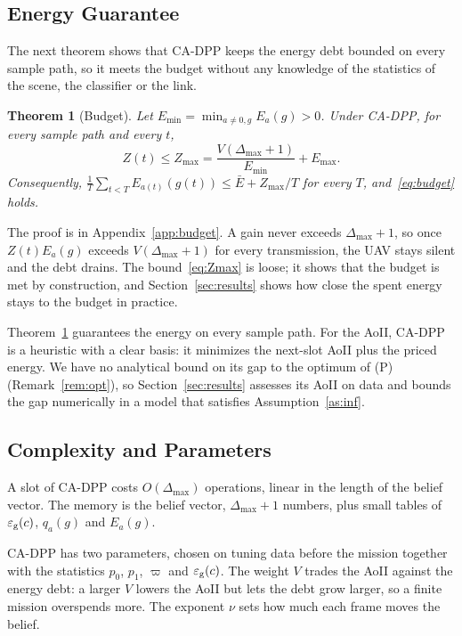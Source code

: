 \documentclass[5p,twocolumn]{elsarticle}
\newtheorem{theorem}{Theorem}
\theoremstyle{remark}
\newcommand{\ee}{\varepsilon}
\begin{document}
\subsection{Energy Guarantee}
The next theorem shows that CA-DPP keeps the energy debt bounded on every sample path, so it meets the budget without any knowledge of the statistics of the scene, the classifier or the link.

\begin{theorem}[Budget]\label{thm:budget}
Let $E_{\min}=\min_{a\neq0,g}E_a(g)>0$. Under CA-DPP, for every sample path and every $t$,
\begin{equation}\label{eq:Zmax}
Z(t)\le Z_{\max}=\frac{V(\Delta_{\max}+1)}{E_{\min}}+E_{\max}.
\end{equation}
Consequently, $\frac1T\sum_{t<T}E_{a(t)}(g(t))\le\bar E+Z_{\max}/T$ for every $T$, and~\eqref{eq:budget} holds.
\end{theorem}

The proof is in Appendix~\ref{app:budget}. A gain never exceeds $\Delta_{\max}+1$, so once $Z(t)E_a(g)$ exceeds $V(\Delta_{\max}+1)$ for every transmission, the UAV stays silent and the debt drains. The bound~\eqref{eq:Zmax} is loose; it shows that the budget is met by construction, and Section~\ref{sec:results} shows how close the spent energy stays to the budget in practice.

Theorem~\ref{thm:budget} guarantees the energy on every sample path. For the AoII, CA-DPP is a heuristic with a clear basis: it minimizes the next-slot AoII plus the priced energy. We have no analytical bound on its gap to the optimum of (P) (Remark~\ref{rem:opt}), so Section~\ref{sec:results} assesses its AoII on data and bounds the gap numerically in a model that satisfies Assumption~\ref{as:inf}.

\subsection{Complexity and Parameters}
A slot of CA-DPP costs $O(\Delta_{\max})$ operations, linear in the length of the belief vector. The memory is the belief vector, $\Delta_{\max}+1$ numbers, plus small tables of $\ee_{\rm g}(c)$, $q_a(g)$ and $E_a(g)$.

CA-DPP has two parameters, chosen on tuning data before the mission together with the statistics $p_0$, $p_1$, $\varpi$ and $\ee_{\rm g}(c)$. The weight $V$ trades the AoII against the energy debt: a larger $V$ lowers the AoII but lets the debt grow larger, so a finite mission overspends more. The exponent $\nu$ sets how much each frame moves the belief.
\end{document}
